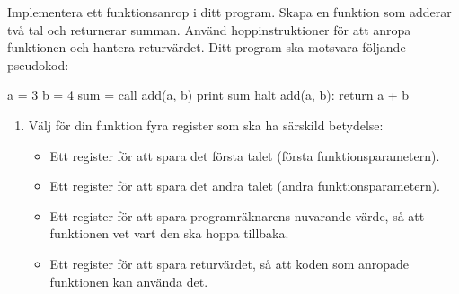 \begin{Extrauppgifter}
    \item {} Implementera ett funktionsanrop i ditt program. Skapa en funktion som adderar två tal och returnerar summan. Använd hoppinstruktioner för att anropa funktionen och hantera returvärdet. Ditt program ska motsvara följande pseudokod:
    \begin{Code}
        a = 3
        b = 4
        sum = call add(a, b)
        print sum
        halt
        add(a, b):
            return a + b
    \end{Code}
    \vspace{-3mm}
    \begin{enumerate}
        \item Välj för din funktion fyra register som ska ha särskild betydelse:
              \begin{itemize}
                  \item Ett register för att spara det första talet (första funktionsparametern).
                  \item Ett register för att spara det andra talet (andra funktionsparametern).
                  \item Ett register för att spara programräknarens nuvarande värde, så att funktionen vet vart den ska hoppa tillbaka.
                  \item Ett register för att spara returvärdet, så att koden som anropade funktionen kan använda det.
              \end{itemize}


\end{enumerate}
\end{Extrauppgifter}
